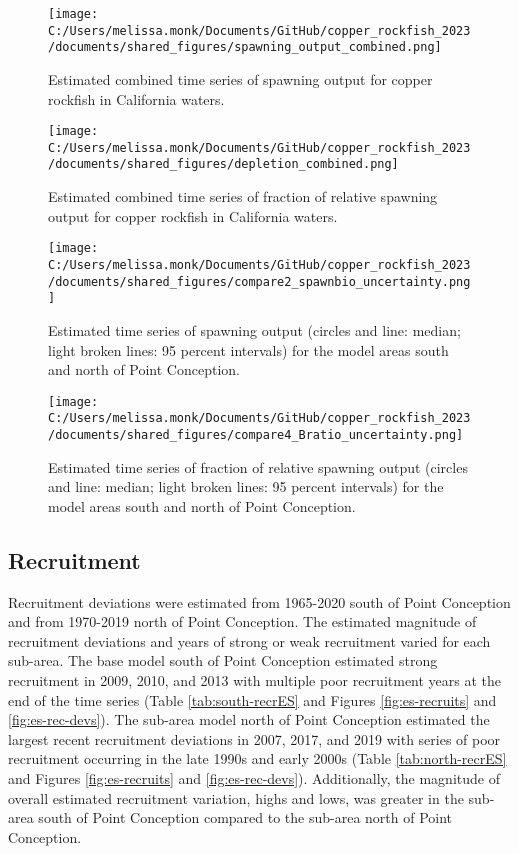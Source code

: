 \documentclass[11pt,
  english,
  letterpaper,
]{article}
\begin{document}
\begin{figure}
\centering
\texttt{[image: C:/Users/melissa.monk/Documents/GitHub/copper\_rockfish\_2023/documents/shared\_figures/spawning\_output\_combined.png]}
\caption{Estimated combined time series of spawning output for copper rockfish in California waters.\label{fig:es-sb-all}}
\end{figure}

\begin{figure}
\centering
\texttt{[image: C:/Users/melissa.monk/Documents/GitHub/copper\_rockfish\_2023/documents/shared\_figures/depletion\_combined.png]}
\caption{Estimated combined time series of fraction of relative spawning output for copper rockfish in California waters.\label{fig:es-depl-all}}
\end{figure}

\begin{figure}
\centering
\texttt{[image: C:/Users/melissa.monk/Documents/GitHub/copper\_rockfish\_2023/documents/shared\_figures/compare2\_spawnbio\_uncertainty.png]}
\caption{Estimated time series of spawning output (circles and line: median; light broken lines: 95 percent intervals) for the model areas south and north of Point Conception.\label{fig:es-sb}}
\end{figure}

\begin{figure}
\centering
\texttt{[image: C:/Users/melissa.monk/Documents/GitHub/copper\_rockfish\_2023/documents/shared\_figures/compare4\_Bratio\_uncertainty.png]}
\caption{Estimated time series of fraction of relative spawning output (circles and line: median; light broken lines: 95 percent intervals) for the model areas south and north of Point Conception.\label{fig:es-depl}}
\end{figure}

\pagebreak

\hypertarget{recruitment}{%
\subsection*{Recruitment}\label{recruitment}}

Recruitment deviations were estimated from 1965-2020 south of Point Conception and from 1970-2019 north of Point Conception. The estimated magnitude of recruitment deviations and years of strong or weak recruitment varied for each sub-area. The base model south of Point Conception estimated strong recruitment in 2009, 2010, and 2013 with multiple poor recruitment years at the end of the time series (Table \ref{tab:south-recrES} and Figures \ref{fig:es-recruits} and \ref{fig:es-rec-devs}). The sub-area model north of Point Conception estimated the largest recent recruitment deviations in 2007, 2017, and 2019 with series of poor recruitment occurring in the late 1990s and early 2000s (Table \ref{tab:north-recrES} and Figures \ref{fig:es-recruits} and \ref{fig:es-rec-devs}). Additionally, the magnitude of overall estimated recruitment variation, highs and lows, was greater in the sub-area south of Point Conception compared to the sub-area north of Point Conception.
\end{document}
